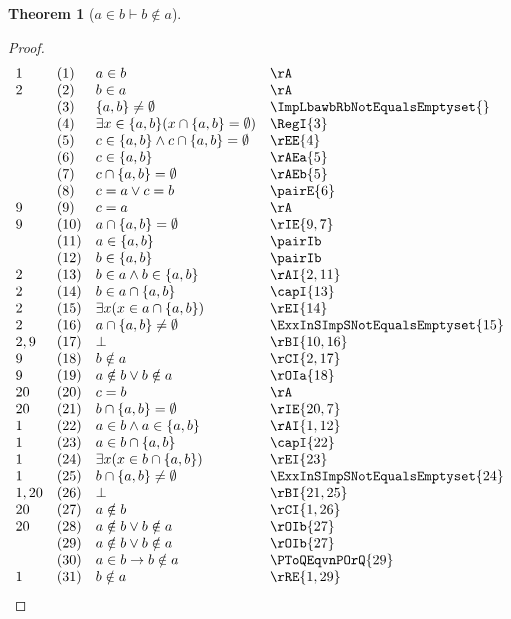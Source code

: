 \documentclass{book}
\theoremstyle{plain}
\newtheorem{theorem}{Theorem}
\theoremstyle{remark}
\theoremstyle{definition}
\begin{document}
\label{aInbImpbNotina}
\begin{theorem}[\(a\in b \vdash b\notin a\)]
\end{theorem}
\begin{proof}
	\[
	\begin{array}{llll}
		1 &  (1) & a\in b & \rA \\
		2 &  (2) & b\in a & \rA \\
		&  (3) & \{a,b\}\neq\emptyset & \ImpLbawbRbNotEqualsEmptyset{} \\
		&  (4) & \exists x\in\{a,b\}(x\cap \{a,b\} = \emptyset) & \RegI{3} \\
		&  (5) & c\in\{a,b\}\land c\cap \{a,b\} = \emptyset & \rEE{4} \\
		&  (6) & c\in\{a,b\} & \rAEa{5} \\
		&  (7) & c\cap \{a,b\} = \emptyset & \rAEb{5} \\		
		&  (8) & c=a\lor c=b & \pairE{6}  \\
		9 & (9) & c=a & \rA \\
		9 & (10) & a\cap \{a,b\} = \emptyset & \rIE{9,7} \\
		& (11) & a\in \{a,b\}  &  \pairIb \\
		& (12) & b\in \{a,b\}  &  \pairIb \\
		2 & (13) & b\in a\land b\in \{a,b\}  &  \rAI{2,11} \\
		2 & (14) & b\in a\cap \{a,b\}  &  \capI{13} \\
		2 & (15) & \exists x(x\in a\cap \{a,b\})  &  \rEI{14} \\
		2 & (16) & a\cap \{a,b\}\neq\emptyset  &  \ExxInSImpSNotEqualsEmptyset{15} \\
		2,9 & (17) & \bot  &  \rBI{10,16} \\
		9 & (18) & b\notin a  &  \rCI{2,17} \\
		9 & (19) & a\notin b\lor b\notin a  &  \rOIa{18} \\		
		20 & (20) & c=b & \rA \\
		20 & (21) & b\cap \{a,b\} = \emptyset & \rIE{20,7} \\
		1 & (22) & a\in b\land a\in \{a,b\}  &  \rAI{1,12} \\
		1 & (23) & a\in b\cap \{a,b\}  &  \capI{22} \\
		1 & (24) & \exists x(x\in b\cap \{a,b\})  &  \rEI{23} \\
		1 & (25) & b\cap \{a,b\}\neq\emptyset  &  \ExxInSImpSNotEqualsEmptyset{24} \\
		1,20 & (26) & \bot  &  \rBI{21,25} \\
		20 & (27) & a\notin b  &  \rCI{1,26} \\
		20 & (28) & a\notin b\lor b\notin a  &  \rOIb{27} \\
		& (29) & a\notin b\lor b\notin a  &  \rOIb{27} \\
		& (30) & a\in b\rightarrow b\notin a  & \PToQEqvnPOrQ{29} \\
		1 & (31) & b\notin a  & \rRE{1,29} \\			
	\end{array}
	\]
\end{proof}
\end{document}
